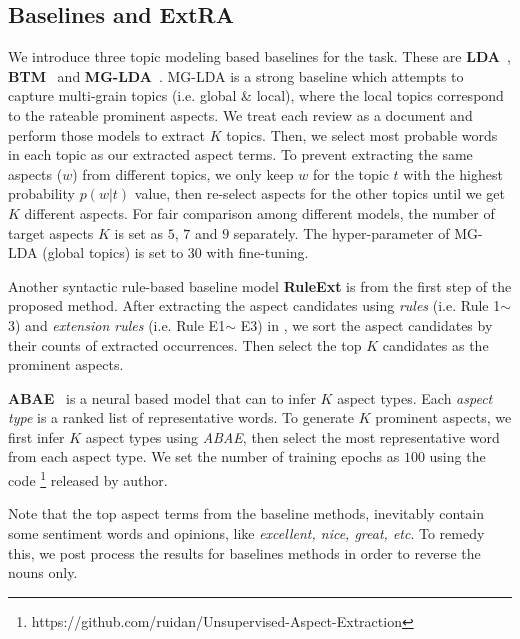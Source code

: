 \subsection{Baselines and ExtRA}
\label{sec:base}
We introduce three topic modeling based baselines for the task.
These are \textbf{LDA}~\cite{Blei2003LatentDA}, 
\textbf{BTM}~\cite{DBLP:journals/tkde/ChengYLG14} and  
\textbf{MG-LDA}~\cite{titov2008modeling}. MG-LDA is a strong
baseline which attempts to capture multi-grain topics (i.e. global \& local), where the local topics correspond to the rateable prominent aspects.
We treat each review as a document and perform those models
to extract $K$ topics.
Then, we select most probable words in 
each topic as our extracted aspect terms. 
To prevent extracting the same aspects ($w$) from different topics, 
we only keep $w$ for the topic $t$ with the highest 
probability $p(w|t)$ value, then re-select aspects for the other 
topics until we get $K$ different aspects. 
For fair comparison among different models, the number of 
target aspects $K$ is set as $5$, $7$ and $9$ separately. 
The hyper-parameter of 
MG-LDA (global topics) is set to 30 with fine-tuning.

Another syntactic rule-based baseline model 
\textbf{RuleExt} is from the first step of 
the proposed method. 
After extracting the aspect candidates using
\emph{rules} (i.e. Rule 1$\sim$ 3) and \emph{extension rules}
(i.e. Rule E1$\sim$ E3) in , 
we sort the aspect candidates by 
their counts of extracted occurrences. 
Then select the top $K$ 
candidates as the prominent aspects.

\textbf{ABAE}~\cite{DBLP:conf/acl/HeLND17}  is a neural based model that can
to infer $K$ aspect types. 
Each \emph{aspect type} is a ranked list of representative words.
To generate $K$ prominent aspects, 
we first infer $K$ aspect types using \emph{ABAE}, 
then select the most representative word from each
aspect type. We set the number of training
epochs as $100$ using the code \footnote{https://github.com/ruidan/Unsupervised-Aspect-Extraction} released by author.

Note that the top aspect terms from the baseline methods, 
inevitably contain some sentiment words and opinions, like \textit{
excellent, nice, great, etc}. 
To remedy this, we post process the results for baselines methods
in order to reverse the nouns only.

